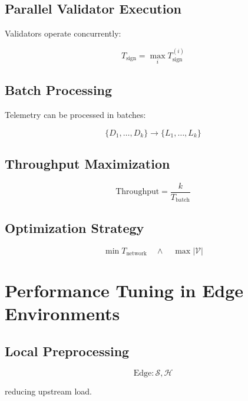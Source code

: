 \subsection{Parallel Validator Execution}

Validators operate concurrently:

\begin{equation}
T_{\text{sign}} = \max_i T_{\text{sign}}^{(i)}
\end{equation}

\subsection{Batch Processing}

Telemetry can be processed in batches:

\begin{equation}
\{D_1, \dots, D_k\} \rightarrow \{L_1, \dots, L_k\}
\end{equation}

\subsection{Throughput Maximization}

\begin{equation}
\text{Throughput} = \frac{k}{T_{\text{batch}}}
\end{equation}

\subsection{Optimization Strategy}

\begin{equation}
\min T_{\text{network}} \quad \land \quad \max |\mathcal{V}|
\end{equation}

\section{Performance Tuning in Edge Environments}

\subsection{Local Preprocessing}

\begin{equation}
\text{Edge}: \mathcal{S}, \mathcal{H}
\end{equation}

reducing upstream load.

